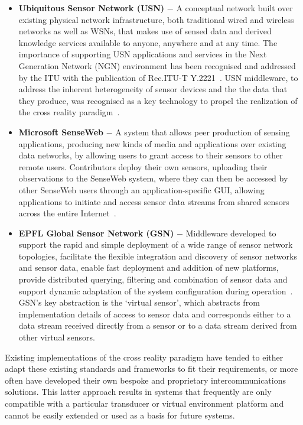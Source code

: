 \documentclass{sig-alternate}
\begin{document}
{\begin{itemize}
	\item{\bf{Ubiquitous Sensor Network (USN)}} $-$ A conceptual network built over existing physical network infrastructure, both traditional wired and wireless networks as well as WSNs, that makes use of sensed data and derived knowledge services available to anyone, anywhere and at any time. The importance of supporting USN applications and services in the Next Generation Network (NGN) environment has been recognised and addressed by the ITU with the publication of Rec.ITU-T Y.2221~\cite{ITU2010}. USN middleware, to address the inherent heterogeneity of sensor devices and the the data that they produce, was recognised as a key technology to propel the realization of the cross reality paradigm~\cite{kim:practical}.

	\item{\bf{Microsoft SenseWeb}} $-$ A system that allows peer production of sensing applications, producing new kinds of media and applications over existing data networks, by allowing users to grant access to their sensors to other remote users. Contributors deploy their own sensors, uploading their observations to the SenseWeb system, where they can then be accessed by other SenseWeb users through an application-specific GUI, allowing applications to initiate and access sensor data streams from shared sensors across the entire Internet~\cite{Kansal2007}.

	\item{\bf{EPFL Global Sensor Network (GSN)}} $-$ Middleware developed to support the rapid and simple deployment of a wide range of sensor network topologies, facilitate the flexible integration and discovery of sensor networks and sensor data, enable fast deployment and addition of new platforms, provide distributed querying, filtering and combination of sensor data and support dynamic adaptation of the system configuration during operation~\cite{Aberer2006}. GSN's key abstraction is the `virtual sensor', which abstracts from implementation details of access to sensor data and corresponds either to a data stream received directly from a sensor or to a data stream derived from other virtual sensors.

\end{itemize}

Existing implementations of the cross reality paradigm have tended to either adapt these existing standards and frameworks to fit their requirements, or more often have developed their own bespoke and proprietary intercommunications solutions. This latter approach results in systems that frequently are only compatible with a particular transducer or virtual environment platform and cannot be easily extended or used as a basis for future systems.

}
\end{document}
